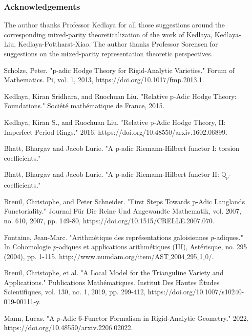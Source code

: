 \documentclass[12pt]{book}
\theoremstyle{definition}
\begin{document}
\newpage
\subsubsection*{Acknowledgements}
The author thanks Professor Kedlaya for all those suggestions around the corresponding mixed-parity theoreticalization of the work of Kedlaya, Kedlaya-Liu, Kedlaya-Pottharst-Xiao. The author thanks Professor Sorensen for suggestions on the mixed-parity representation theoretic perspectives.




\newpage

\begin{thebibliography}{}

 Scholze, Peter. "p-adic Hodge Theory for Rigid-Analytic Varieties." Forum of Mathematics. Pi, vol. 1, 2013, https://doi.org/10.1017/fmp.2013.1.

 Kedlaya, Kiran Sridhara, and Ruochuan Liu. "Relative p-Adic Hodge Theory: Foundations." Soci\'et\'e math\'ematique de France, 2015.

 Kedlaya, Kiran S., and Ruochuan Liu. "Relative p-Adic Hodge Theory, II: Imperfect Period Rings." 2016, https://doi.org/10.48550/arxiv.1602.06899.

 Bhatt, Bhargav and Jacob Lurie. "A p-adic Riemann-Hilbert functor I: torsion coefficients."

 Bhatt, Bhargav and Jacob Lurie. "A p-adic Riemann-Hilbert functor II: $\mathbb{Q}_p$-coefficients."

 Breuil, Christophe, and Peter Schneider. "First Steps Towards p-Adic Langlands Functoriality." Journal F\"ur Die Reine Und Angewandte Mathematik, vol. 2007, no. 610, 2007, pp. 149-80, https://doi.org/10.1515/CRELLE.2007.070.

 Fontaine, Jean-Marc. "Arithm\'etique des repr\'esentations galoisiennes $p$-adiques." In Cohomologie $p$-adiques et applications arithm\'etiques (III), Ast\'erisque, no. 295 (2004), pp. 1-115. http://www.numdam.org/item/AST$\_$2004$\_$295$\_$1$\_$0/.

 Breuil, Christophe, et al. "A Local Model for the Trianguline Variety and Applications." Publications Math\'ematiques. Institut Des Hautes \'Etudes Scientifiques, vol. 130, no. 1, 2019, pp. 299-412, https://doi.org/10.1007/s10240-019-00111-y.

  Mann, Lucas. "A $p$-Adic 6-Functor Formalism in Rigid-Analytic Geometry." 2022, https://doi.org/10.48550/arxiv.2206.02022.


\end{thebibliography}
\end{document}
